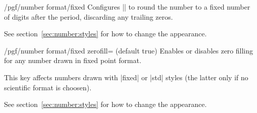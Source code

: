 \begin{key}{/pgf/number format/fixed}
Configures |\pgfmathprintnumber| to round the number to a fixed number of digits after the period, discarding any trailing zeros.

\begin{codeexample}[]
\hspace{1em}
\hspace{1em}
\hspace{1em}
\hspace{1em}
\end{codeexample}

See section~\ref{sec:number:styles} for how to change the appearance.
\end{key}

\begin{key}{/pgf/number format/fixed zerofill=  (default true)}
Enables or disables zero filling for any number drawn in fixed point format.

\begin{codeexample}[]
\hspace{1em}
\hspace{1em}
\hspace{1em}
\hspace{1em}
\end{codeexample}
This key affects numbers drawn with |fixed| or |std| styles (the latter only if no scientific format is choosen).
\begin{codeexample}[]
\hspace{1em}
\hspace{1em}
\hspace{1em}
\end{codeexample}

See section~\ref{sec:number:styles} for how to change the appearance.
\end{key}

